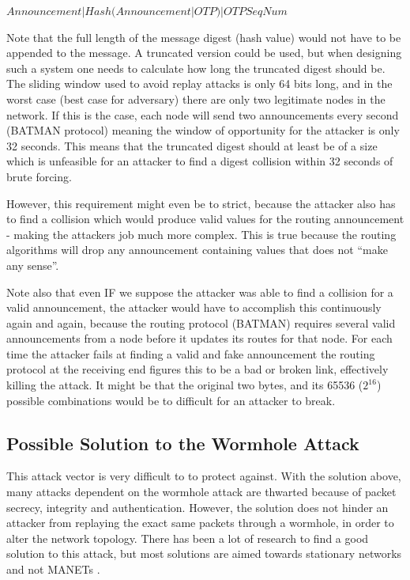 $Announcement | Hash(Announcement | OTP) | OTPSeqNum$

Note that the full length of the message digest (hash value) would not have to
be appended to the message. A truncated version could be used, but when
designing such a system one needs to calculate how long the truncated digest
should be. The sliding window used to avoid replay attacks is only 64 bits long,
and in the worst case (best case for adversary) there are only two legitimate
nodes in the network. If this is the case, each node will send two
announcements every second (BATMAN protocol) meaning the window of opportunity
for the attacker is only 32 seconds. This means that the truncated digest should
at least be of a size which is unfeasible for an attacker to find a digest
collision within 32 seconds of brute forcing.

However, this requirement might even be to strict, because the attacker also has
to find a collision which would produce valid values for the routing
announcement - making the attackers job much more complex. This is true because
the routing algorithms will drop any announcement containing values that does
not ``make any sense''.

Note also that even IF we suppose the attacker was able to find a collision for
a valid announcement, the attacker would have to accomplish this continuously
again and again, because the routing protocol (BATMAN) requires several valid
announcements from a node before it updates its routes for that node. For each
time the attacker fails at finding a valid and fake announcement the routing
protocol at the receiving end figures this to be a bad or broken link,
effectively killing the attack. It might be that the original two bytes, and its
65536 ($2^16$) possible combinations would be to difficult for an attacker to
break.

\subsection{Possible Solution to the Wormhole Attack}
This attack vector is very difficult to to protect against. With the solution
above, many attacks dependent on the wormhole attack are thwarted because of
packet secrecy, integrity and authentication. However, the solution does not
hinder an attacker from replaying the exact same packets through a wormhole, in
order to alter the network topology. There has been a lot of research to find a
good solution to this attack, but most solutions are aimed towards stationary
networks and not \acp{MANET} \cite{raoteapproaches}.

